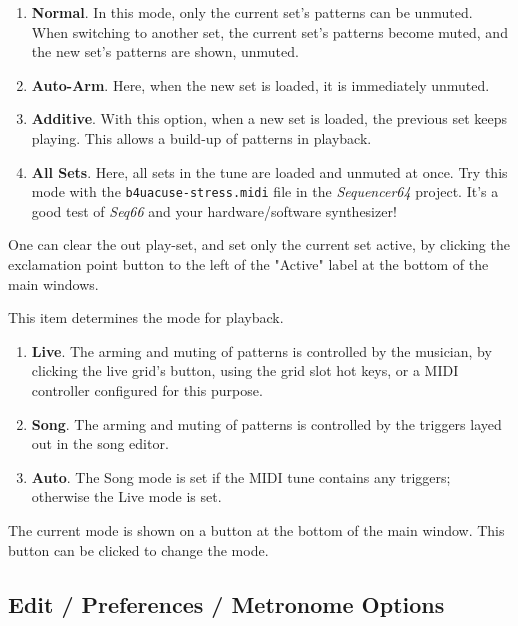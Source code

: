    \begin{enumerate}
      \item \textbf{Normal}.
         In this mode, only the current set's patterns can be unmuted.
         When switching to another set, the current set's patterns become
         muted, and the new set's patterns are shown, unmuted.
      \item \textbf{Auto-Arm}.
         Here, when the new set is loaded, it is immediately unmuted.
      \item \textbf{Additive}.
         With this option, when a new set is loaded, the previous set keeps
         playing. This allows a build-up of patterns in playback.
      \item \textbf{All Sets}.
         Here, all sets in the tune are loaded and unmuted at once.
         Try this mode with the \texttt{b4uacuse-stress.midi} file
         in the \textsl{Sequencer64} project.  It's a good test of
         \textsl{Seq66} and your hardware/software synthesizer!
   \end{enumerate}

   One can clear the out play-set, and set only the current set active, by
   clicking the exclamation point button to the left of the "Active" label at
   the bottom of the main windows.

   This item determines the mode for playback.

   \begin{enumerate}
      \item \textbf{Live}.
         The arming and muting of patterns is controlled by the musician,
         by clicking the live grid's button, using the grid slot
         hot keys, or a MIDI controller configured for this purpose.
      \item \textbf{Song}.
         The arming and muting of patterns is controlled by the
         triggers layed out in the song editor.
      \item \textbf{Auto}.
         The Song mode is set if the MIDI tune contains any triggers;
         otherwise the Live mode is set.
   \end{enumerate}

   The current mode is shown on a button at the bottom of the main window.
   This button can be clicked to change the mode.

\subsection{Edit / Preferences / Metronome Options}
\label{subsection:edit_preferences_metronome}

